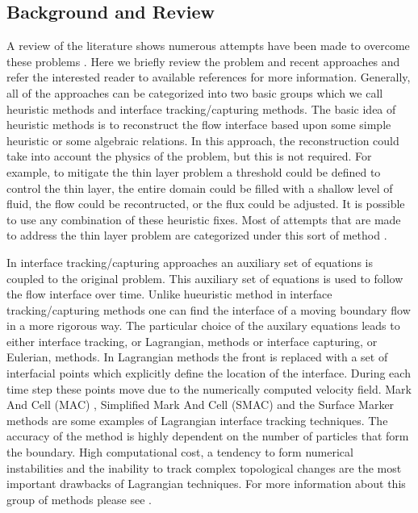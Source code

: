\documentclass[letterpaper,10pt]{article}
\begin{document}
\subsection{Background and Review}
A review of the literature shows numerous attempts have been made to overcome these problems \cite{Medeiros2013,Balzano1998,Aureli2008,Bunya2009,Casulli2009a,
Kesserwani2011,DAlpaos2007,Castro2005a}.
Here we briefly review the problem and recent approaches and refer the interested reader to available references for more information.
Generally, all of the approaches can be 
categorized into two basic groups which we call heuristic methods and interface tracking/capturing methods.
The basic idea of heuristic methods is to reconstruct the flow interface based upon 
some simple heuristic or some algebraic relations. In this approach, the reconstruction could take into account the physics of the problem, but this is not required. 
For example, to mitigate the thin layer problem a threshold could be defined to control the thin layer, the entire domain could be filled with a shallow level of fluid,
the flow could be recontructed, or the flux could be adjusted. It is possible to use any combination of these heuristic fixes.
Most of attempts that are made to address the thin layer problem are categorized under this sort of method \cite{Aureli2008,Bunya2009,Castro2005a,Kesserwani2011}.

In interface tracking/capturing approaches
an auxiliary set of equations is coupled to the original problem. This auxiliary set of equations is used to follow the flow interface over time. 
Unlike hueuristic method in interface tracking/capturing methods one can find the interface of a moving boundary flow in a more rigorous way. 
The particular choice of the auxilary equations leads to either interface tracking, or Lagrangian, methods or interface capturing, or Eulerian, methods.
In Lagrangian methods the front is replaced with a set of interfacial points which explicitly define the location of the interface.
During each time step these points move due to the numerically computed velocity field.
Mark And Cell (MAC) \cite{Harlow1965}, Simplified Mark And Cell (SMAC) \cite{Cheng1995} and the Surface Marker \citep{Wrobel1991} methods are some examples of Lagrangian interface tracking techniques.
The accuracy of the method is highly dependent on the number of particles that form the boundary.
High computational cost, a tendency to form numerical instabilities and the inability to track complex topological changes are the most important drawbacks of Lagrangian techniques.
For more information about this group of methods please see \cite{Glimm1995,Unverdi1992,Osher1988,Anderson1998,hirt1981vfv}.
\end{document}
